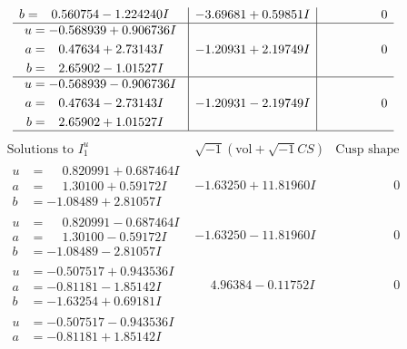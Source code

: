 \documentclass[1p]{elsarticle_modified}
\theoremstyle{definition}
\newcommand{\I}{\sqrt{-1}}
\begin{document}
$$\begin{array}{c|c|c}
\begin{aligned}
b &= \phantom{-}0.560754 - 1.224240 I\end{aligned}
 & -3.69681 + 0.59851 I & \phantom{-0.000000 } 0 \\ \hline\begin{aligned}
u &= -0.568939 + 0.906736 I \\
a &= \phantom{-}0.47634 + 2.73143 I \\
b &= \phantom{-}2.65902 - 1.01527 I\end{aligned}
 & -1.20931 + 2.19749 I & \phantom{-0.000000 } 0 \\ \hline\begin{aligned}
u &= -0.568939 - 0.906736 I \\
a &= \phantom{-}0.47634 - 2.73143 I \\
b &= \phantom{-}2.65902 + 1.01527 I\end{aligned}
 & -1.20931 - 2.19749 I & \phantom{-0.000000 } 0\\
 \hline 
 \end{array}$$\newpage$$\begin{array}{c|c|c}  
\text{Solutions to }I^u_{1}& \I (\text{vol} + \sqrt{-1}CS) & \text{Cusp shape}\\
 \hline 
\begin{aligned}
u &= \phantom{-}0.820991 + 0.687464 I \\
a &= \phantom{-}1.30100 + 0.59172 I \\
b &= -1.08489 + 2.81057 I\end{aligned}
 & -1.63250 + 11.81960 I & \phantom{-0.000000 } 0 \\ \hline\begin{aligned}
u &= \phantom{-}0.820991 - 0.687464 I \\
a &= \phantom{-}1.30100 - 0.59172 I \\
b &= -1.08489 - 2.81057 I\end{aligned}
 & -1.63250 - 11.81960 I & \phantom{-0.000000 } 0 \\ \hline\begin{aligned}
u &= -0.507517 + 0.943536 I \\
a &= -0.81181 - 1.85142 I \\
b &= -1.63254 + 0.69181 I\end{aligned}
 & \phantom{-}4.96384 - 0.11752 I & \phantom{-0.000000 } 0 \\ \hline\begin{aligned}
u &= -0.507517 - 0.943536 I \\
a &= -0.81181 + 1.85142 I \\

\end{aligned}
\end{array}$$
\end{document}
